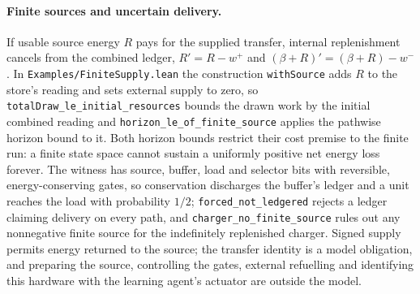 \documentclass{article}
\begin{document}
\paragraph{Finite sources and uncertain delivery.}
If usable source energy $R$ pays for the supplied transfer, internal
replenishment cancels from the combined ledger, $R'=R-w^+$ and
$(\beta+R)'=(\beta+R)-w^-$. In \nolinkurl{Examples/FiniteSupply.lean} the construction \texttt{withSource} adds $R$ to
the store's reading and sets external supply to zero, so
\nolinkurl{totalDraw_le_initial_resources}
bounds the drawn work by the initial combined reading and
\nolinkurl{horizon_le_of_finite_source}
applies the pathwise horizon bound to it. Both horizon bounds restrict their
cost premise to the finite run: a finite state space cannot sustain a uniformly
positive net energy loss forever. The witness has source, buffer, load and
selector bits with reversible, energy-conserving gates, so conservation
discharges the buffer's ledger and a unit reaches the load with probability
$1/2$; \nolinkurl{forced_not_ledgered} rejects a ledger
claiming delivery on every path, and
\nolinkurl{charger_no_finite_source} rules
out any nonnegative finite source for the indefinitely replenished charger.
Signed supply permits energy returned to the source; the transfer identity is a
model obligation, and preparing the source, controlling the gates, external
refuelling and identifying this hardware with the learning agent's actuator are
outside the model.
\end{document}
